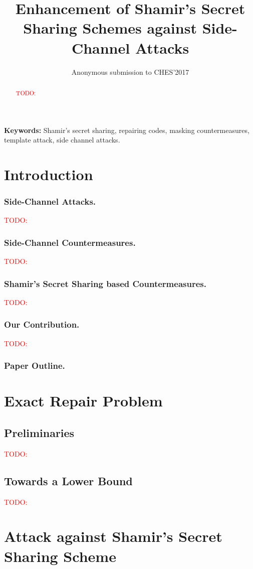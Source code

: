 \documentclass{llncs}
\title{Enhancement of Shamir's Secret Sharing Schemes against Side-Channel Attacks}
\author{Anonymous submission to CHES'2017}
\institute{}
\newcommand\todo[1]{\textcolor{red}{TODO: #1}}
\begin{document}
\maketitle
\begin{abstract}
 \todo{}
\end{abstract}
{\bf Keywords:} Shamir's secret sharing, repairing codes, masking countermeasures, template attack, side channel attacks.
 

\section{Introduction}
\label{sec-intro}

\subsubsection{Side-Channel Attacks.}
 \todo{}
\subsubsection{Side-Channel Countermeasures.} 
 \todo{}
\subsubsection{Shamir's Secret Sharing based Countermeasures.}
 \todo{} 
\subsubsection{Our Contribution.}
 \todo{}
\subsubsection{Paper Outline.}


\section{Exact Repair Problem}
\subsection{Preliminaries}
 \todo{}
\subsection{Towards a Lower Bound}
 \todo{}

\section{Attack against Shamir's Secret Sharing Scheme }
\end{document}
